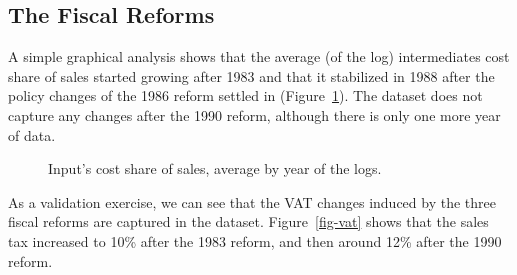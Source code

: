 \documentclass[
  12pt]{article}
\theoremstyle{definition}
\theoremstyle{remark}
\begin{document}
\subsection{The Fiscal Reforms}\label{the-fiscal-reforms}

A simple graphical analysis shows that the average (of the log)
intermediates cost share of sales started growing after 1983 and that it
stabilized in 1988 after the policy changes of the 1986 reform settled
in (Figure~\ref{fig-logshare}). The dataset does not capture any changes
after the 1990 reform, although there is only one more year of data.

\begin{figure}


\caption{\label{fig-logshare}Input's cost share of sales, average by
year of the logs.}

\end{figure}%

As a validation exercise, we can see that the VAT changes induced by the
three fiscal reforms are captured in the dataset. Figure~\ref{fig-vat}
shows that the sales tax increased to 10\% after the 1983 reform, and
then around 12\% after the 1990 reform.
\end{document}

